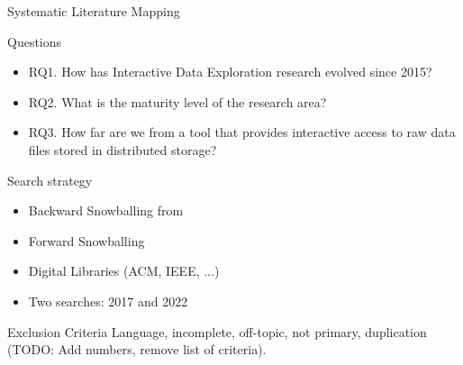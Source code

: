 \documentclass[10pt]{beamer}
\begin{document}
\begin{frame}{Systematic Literature Mapping}
\begin{alertblock}{Questions}
    \begin{itemize}
        \item RQ1. How has Interactive Data Exploration research evolved since 2015?
        \item RQ2. What is the maturity level of the research area?
        \item RQ3. How far are we from a tool that provides \alert{interactive} access
            to \alert{raw} data files stored in \alert{distributed} storage?
    \end{itemize}
\end{alertblock}
\begin{block}{Search strategy}
    \begin{itemize}
        \item Backward Snowballing from \cite{Idreos2015}
        \item Forward Snowballing
        \item Digital Libraries (ACM, IEEE, ...)
        \item Two searches: 2017 and 2022
    \end{itemize}
\end{block}
\begin{block}{Exclusion Criteria}
    \smallskip
    Language, incomplete, off-topic, not primary, duplication (TODO: Add numbers, remove list of criteria).
\end{block}

\end{frame}
\end{document}
